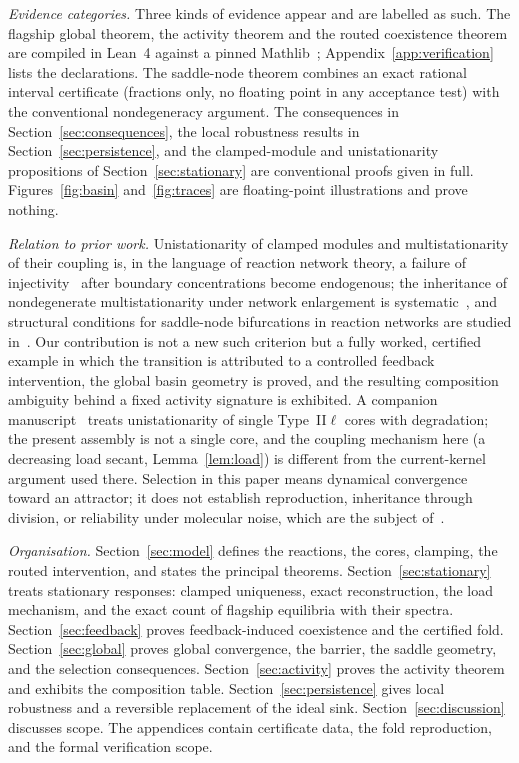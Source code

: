 \documentclass[11pt,a4paper]{article}
\theoremstyle{plain}
\theoremstyle{definition}
\theoremstyle{remark}
\begin{document}
\emph{Evidence categories.} Three kinds of evidence appear and are labelled as such. The flagship global theorem, the activity theorem and the routed coexistence theorem are compiled in Lean~4 against a pinned Mathlib~\cite{demoura2021,mathlib2020}; Appendix~\ref{app:verification} lists the declarations. The saddle-node theorem combines an exact rational interval certificate (fractions only, no floating point in any acceptance test) with the conventional nondegeneracy argument. The consequences in Section~\ref{sec:consequences}, the local robustness results in Section~\ref{sec:persistence}, and the clamped-module and unistationarity propositions of Section~\ref{sec:stationary} are conventional proofs given in full. Figures~\ref{fig:basin} and~\ref{fig:traces} are floating-point illustrations and prove nothing.

\emph{Relation to prior work.} Unistationarity of clamped modules and multistationarity of their coupling is, in the language of reaction network theory, a failure of injectivity~\cite{craciun2005,feinberg2019} after boundary concentrations become endogenous; the inheritance of nondegenerate multistationarity under network enlargement is systematic~\cite{banaji2018}, and structural conditions for saddle-node bifurcations in reaction networks are studied in~\cite{vassena2023}. Our contribution is not a new such criterion but a fully worked, certified example in which the transition is attributed to a controlled feedback intervention, the global basin geometry is proved, and the resulting composition ambiguity behind a fixed activity signature is exhibited. A companion manuscript~\cite{typeIIl2026} treats unistationarity of single Type~II$\ell$ cores with degradation; the present assembly is not a single core, and the coupling mechanism here (a decreasing load secant, Lemma~\ref{lem:load}) is different from the current-kernel argument used there. Selection in this paper means dynamical convergence toward an attractor; it does not establish reproduction, inheritance through division, or reliability under molecular noise, which are the subject of~\cite{copying2026}.

\emph{Organisation.} Section~\ref{sec:model} defines the reactions, the cores, clamping, the routed intervention, and states the principal theorems. Section~\ref{sec:stationary} treats stationary responses: clamped uniqueness, exact reconstruction, the load mechanism, and the exact count of flagship equilibria with their spectra. Section~\ref{sec:feedback} proves feedback-induced coexistence and the certified fold. Section~\ref{sec:global} proves global convergence, the barrier, the saddle geometry, and the selection consequences. Section~\ref{sec:activity} proves the activity theorem and exhibits the composition table. Section~\ref{sec:persistence} gives local robustness and a reversible replacement of the ideal sink. Section~\ref{sec:discussion} discusses scope. The appendices contain certificate data, the fold reproduction, and the formal verification scope.
\end{document}

